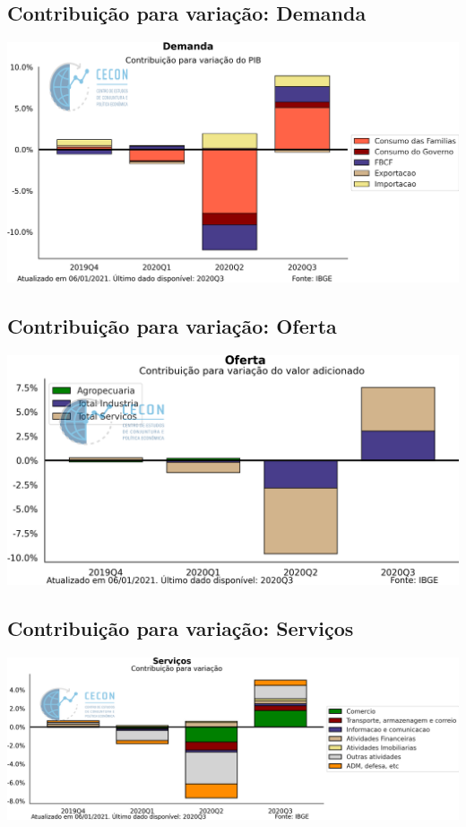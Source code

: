 \documentclass{SelfArx}
\begin{document}
\subsection*{Contribuição para variação: Demanda}
\label{sec:orga21aade}

\begin{center}
\includegraphics[width=.9\linewidth]{./figs/PIB/Contrib_Demanda.png}
\end{center}

\subsection*{Contribuição para variação: Oferta}
\label{sec:orgf8e0f20}

\begin{center}
\includegraphics[width=.9\linewidth]{./figs/PIB/Contrib_Oferta.png}
\end{center}


\subsection*{Contribuição para variação: Serviços}
\label{sec:org273dc4b}

\begin{center}
\includegraphics[width=.9\linewidth]{./figs/PIB/Contrib_Servicos.png}
\end{center}
\end{document}
